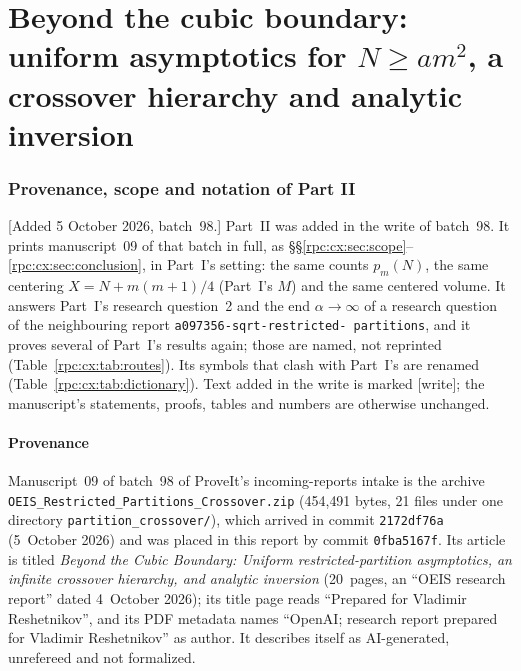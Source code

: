 \documentclass[11pt]{article}
\theoremstyle{definition}
\theoremstyle{remark}
\numberwithin{equation}{section}
\begin{document}
\part{Beyond the cubic boundary: uniform asymptotics for \texorpdfstring{$N\ge am^2$}{N >= a m\textasciicircum 2}, a crossover hierarchy and analytic inversion}
\label{rpc:cx:part}

\setlength{\emergencystretch}{3em}
\section{Provenance, scope and notation of Part II}
\label{rpc:cx:sec:front}

[Added 5 October 2026, batch~98.] Part~II was added in the write of
batch~98. It prints manuscript~09 of that batch in full, as
\S\S\ref{rpc:cx:sec:scope}--\ref{rpc:cx:sec:conclusion}, in Part~I's
setting: the same counts $p_m(N)$, the same centering
$X=N+m(m+1)/4$ (Part~I's $M$) and the same centered volume. It answers
Part~I's research question~2 and the end $\alpha\to\infty$ of a research
question of the neighbouring report
\texttt{a097356-\allowbreak sqrt-\allowbreak restricted-\allowbreak
partitions}, and it proves several of Part~I's results again; those are
named, not reprinted (Table~\ref{rpc:cx:tab:routes}). Its symbols that clash with
Part~I's are renamed (Table~\ref{rpc:cx:tab:dictionary}). Text added in the
write is marked \textsf{[write]}; the manuscript's statements, proofs,
tables and numbers are otherwise unchanged.

\subsection{Provenance}
\label{rpc:cx:sec:provenance}

Manuscript~09 of batch~98 of ProveIt's incoming-reports intake is the
archive
\texttt{OEIS\_\allowbreak Restricted\_\allowbreak Partitions\_\allowbreak Crossover.zip}
(454{,}491 bytes, 21 files under one directory \texttt{partition\_crossover/}),
which arrived in commit \texttt{2172df76a} (5~October 2026) and was placed in
this report by commit \texttt{0fba5167f}. Its article is titled
\emph{Beyond the Cubic Boundary: Uniform restricted-partition asymptotics,
an infinite crossover hierarchy, and analytic inversion} (20~pages, an
``OEIS research report'' dated 4~October 2026); its title page reads
``Prepared for Vladimir Reshetnikov'', and its PDF metadata names ``OpenAI;
research report prepared for Vladimir Reshetnikov'' as author. It describes
itself as AI-generated, unrefereed and not formalized.
\end{document}
